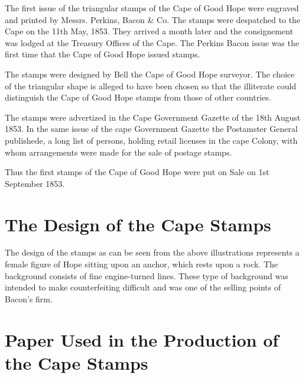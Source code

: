 The first issue of the triangular stamps of the Cape of Good Hope were engraved and printed by Messrs. Perkins, Bacon \& Co. The stamps were despatched to the Cape on the 11th May, 1853. They arrived a month later and the consignement was lodged at the Treasury Offices of the Cape. The Perkins Bacon issue was the first time that the Cape of Good Hope issued stamps.

The stamps were designed by Bell the Cape of Good Hope surveyor. The choice of the triangular shape is alleged to have been chosen so that the illiterate could distinguish the Cape of Good Hope stamps from those of other countries.

The stamps were advertized in the Cape Government Gazette of the 18th August 1853. In the same issue of the cape Government Gazette the Postamster General publishede, a long list of persons, holding retail licenses in the cape Colony, with whom arrangements were made for the sale of postage stamps.

Thus the first stamps of the Cape of Good Hope were put on Sale on 1st September 1853.

\section{The Design of the Cape Stamps}

The design of the stamps as can be seen from the above illustrations represents a female figure of Hope sitting upon an anchor, which rests upon a rock. The background consists of fine engine-turned lines. These type of background was intended to make counterfeiting difficult and was one of the selling points of Bacon's firm.


\section{Paper Used in the Production of the Cape Stamps}

